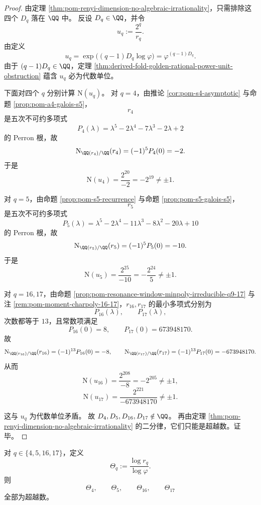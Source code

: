 \begin{proof}
由定理 \ref{thm:pom-renyi-dimension-no-algebraic-irrationality}，只需排除这四个 \(D_q\) 落在 \(\QQ\) 中。
反设 \(D_q\in\QQ\)，并令
\[
u_q:=\frac{2^q}{r_q}.
\]
由定义
\[
u_q=\exp\!\bigl((q-1)D_q\log\varphi\bigr)=\varphi^{(q-1)D_q}.
\]
由于 \((q-1)D_q\in\QQ\)，定理
\ref{thm:derived-fold-golden-rational-power-unit-obstruction} 蕴含 \(u_q\) 必为代数单位。

下面对四个 \(q\) 分别计算 \(\mathrm N(u_q)\)。
对 \(q=4\)，由推论 \ref{cor:pom-s4-asymptotic} 与命题 \ref{prop:pom-a4-galois-s5}，
\[
r_4
\]
是五次不可约多项式
\[
P_4(\lambda)=\lambda^5-2\lambda^4-7\lambda^3-2\lambda+2
\]
的 Perron 根，故
\[
\mathrm N_{\QQ(r_4)/\QQ}(r_4)=(-1)^5P_4(0)=-2.
\]
于是
\[
\mathrm N(u_4)=\frac{2^{20}}{-2}=-2^{19}\neq \pm1.
\]

对 \(q=5\)，由命题 \ref{prop:pom-s5-recurrence} 与命题 \ref{prop:pom-s5-galois-s5}，
\[
r_5
\]
是五次不可约多项式
\[
P_5(\lambda)=\lambda^5-2\lambda^4-11\lambda^3-8\lambda^2-20\lambda+10
\]
的 Perron 根，故
\[
\mathrm N_{\QQ(r_5)/\QQ}(r_5)=(-1)^5P_5(0)=-10.
\]
于是
\[
\mathrm N(u_5)=\frac{2^{25}}{-10}=-\frac{2^{24}}{5}\neq \pm1.
\]

对 \(q=16,17\)，由命题 \ref{prop:pom-resonance-window-minpoly-irreducible-q9-17}
与注 \ref{rem:pom-moment-charpoly-16-17}，\(r_{16},r_{17}\) 的最小多项式分别为
\[
P_{16}(\lambda),\qquad P_{17}(\lambda),
\]
次数都等于 \(13\)，且常数项满足
\[
P_{16}(0)=8,\qquad P_{17}(0)=673948170.
\]
故
\[
\mathrm N_{\QQ(r_{16})/\QQ}(r_{16})=(-1)^{13}P_{16}(0)=-8,
\qquad
\mathrm N_{\QQ(r_{17})/\QQ}(r_{17})=(-1)^{13}P_{17}(0)=-673948170.
\]
从而
\[
\mathrm N(u_{16})=\frac{2^{208}}{-8}=-2^{205}\neq \pm1,
\]
\[
\mathrm N(u_{17})=\frac{2^{221}}{-673948170}\neq \pm1.
\]

这与 \(u_q\) 为代数单位矛盾。
故 \(D_4,D_5,D_{16},D_{17}\notin\QQ\)。
再由定理 \ref{thm:pom-renyi-dimension-no-algebraic-irrationality} 的二分律，它们只能是超越数。证毕。
\end{proof}

\begin{corollary}\label{cor:derived-fold-perron-golden-exponent-transcendence-q4-q5-q16-q17}
对 \(q\in\{4,5,16,17\}\)，定义
\[
\Theta_q:=\frac{\log r_q}{\log\varphi}.
\]
则
\[
\Theta_4,\qquad \Theta_5,\qquad \Theta_{16},\qquad \Theta_{17}
\]
全部为超越数。
\end{corollary}

